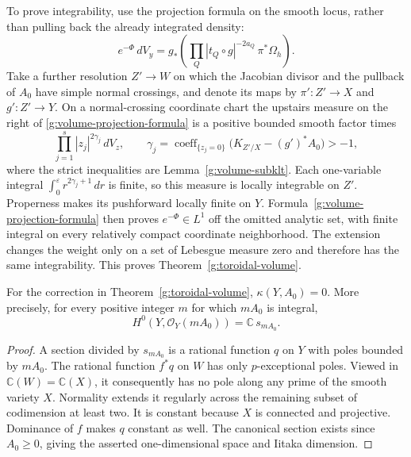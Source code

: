 To prove integrability, use the projection formula on the smooth
locus, rather than pulling back the already integrated density:
\begin{equation}\label{g:volume-projection-formula}
 e^{-\Phi}\,dV_y
 =g_*\left(\prod_Q|t_Q\circ g|^{-2a_Q}\,
                      \pi^*\Omega_h\right).
\end{equation}
Take a further resolution $Z'\to W$ on which the Jacobian divisor
and the pullback of $A_0$ have simple normal crossings, and denote
its maps by $\pi':Z'\to X$ and $g':Z'\to Y$.  On a normal-crossing
coordinate chart the upstairs measure on the right of
\eqref{g:volume-projection-formula} is a positive bounded smooth
factor times
\[
 \prod_{j=1}^s |z_j|^{2\gamma_j}\,dV_z,
 \qquad
 \gamma_j=\operatorname{coeff}_{\{z_j=0\}}
                 \bigl(K_{Z'/X}-(g')^*A_0\bigr)>-1,
\]
where the strict inequalities are
Lemma~\ref{g:volume-subklt}.  Each one-variable integral
$\int_0^\varepsilon r^{2\gamma_j+1}\,dr$ is finite, so this measure
is locally integrable on $Z'$.  Properness makes its pushforward
locally finite on $Y$.  Formula~\eqref{g:volume-projection-formula}
then proves $e^{-\Phi}\in L^1$ off the omitted analytic set, with
finite integral on every relatively compact coordinate neighborhood.
The extension changes the weight only on a set of Lebesgue measure
zero and therefore has the same integrability.  This proves
Theorem~\ref{g:toroidal-volume}.

\begin{corollary}\label{g:correction-iitaka-zero}
For the correction in Theorem~\ref{g:toroidal-volume},
$\kappa(Y,A_0)=0$.  More precisely, for every positive integer $m$
for which $mA_0$ is integral,
\[
 H^0(Y,\mathcal O_Y(mA_0))
   =\mathbb C\,s_{mA_0}.
\]
\end{corollary}

\begin{proof}
A section divided by $s_{mA_0}$ is a rational function $q$ on $Y$
with poles bounded by $mA_0$.  The rational function $f^*q$ on
$W$ has only $p$-exceptional poles.  Viewed in
$\mathbb C(W)=\mathbb C(X)$, it consequently has no pole along any
prime of the smooth variety $X$.  Normality extends it regularly
across the remaining subset of codimension at least two.  It is
constant because $X$ is connected and projective.  Dominance of
$f$ makes $q$ constant as well.  The canonical section exists since
$A_0\geq0$, giving the asserted one-dimensional space and Iitaka
dimension.
\end{proof}
